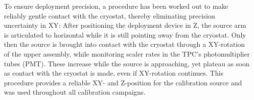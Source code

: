 To ensure deployment precision, a procedure has been worked out to make reliably gentle contact with the cryostat, thereby eliminating precision uncertainty in XY: After positioning the deployment device in Z, the source arm is articulated to horizontal while it is still pointing away from the cryostat. Only then the source is brought into contact with the cryostat through a XY-rotation of the upper assembly, while monitoring scaler rates in the TPC's photomultiplier tubes (PMT).  These increase while the source is approaching, yet plateau as soon as contact with the cryostat is made, even if XY-rotation continues. This procedure provides a reliable XY- and Z-position for the calibration source and was used throughout all calibration campaigns.